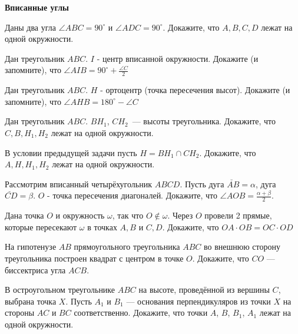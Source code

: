 \documentclass{article}
\begin{document}
    \large

    \begin{center}
        \textbf{Вписанные углы}
    \end{center}

    \begin{enumerate_boxed}

        \item Даны два угла $\angle ABC = 90^\circ$ и $\angle ADC = 90^\circ$.
        Докажите, что $A, B, C, D$ лежат на одной окружности.

        \item Дан треугольник $ABC$. $I$ - центр вписанной окружности.
        Докажите (и запомните), что $\angle AIB = 90^\circ + \frac{\angle C}{2}$

        \item Дан треугольник $ABC$. $H$ - ортоцентр (точка пересечения высот).
        Докажите (и запомните), что $\angle AHB = 180^\circ - \angle C$

        \item Дан треугольник $ABC$. $BH_1$, $CH_2$~--- высоты треугольника.
        Докажите, что $C,B,H_1, H_2$ лежат на одной окружности.

        \item В условии предыдущей задачи пусть $H = BH_1 \cap CH_2$.
        Докажите, что $A,H,H_1, H_2$ лежат на одной окружности.

        \item Рассмотрим вписанный четырёхугольник $ABCD$.
        Пусть дуга $\breve{AB} = \alpha$, дуга $\breve{CD} = \beta$. $O$ - точка пересечения диагоналей.
        Докажите, что $\angle AOB = \frac{\alpha +  \beta}{2}$.

        \item Дана точка $O$ и окружность $\omega$, так что $O \notin \omega$.
        Через $O$ провели 2 прямые, которые пересекают $\omega$ в точках $A, B$ и $C, D$.
        Докажите, что $OA \cdot OB = OC \cdot OD$

        \item На гипотенузе $AB$ прямоугольного треугольника $ABC$ во внешнюю сторону треугольника построен квадрат с центром в точке $O$.
        Докажите, что $CO$ — биссектриса угла $ACB$.

        \item В остроугольном треугольнике $ABC$ на высоте, проведённой из вершины $C$, выбрана точка $X$.
        Пусть $A_1$ и $B_1$ — основания перпендикуляров из точки $X$ на стороны $AC$ и $BC$ соответственно.
        Докажите, что точки $A$, $B$, $B_1$, $A_1$ лежат на одной окружности.


\end{enumerate_boxed}
\end{document}
